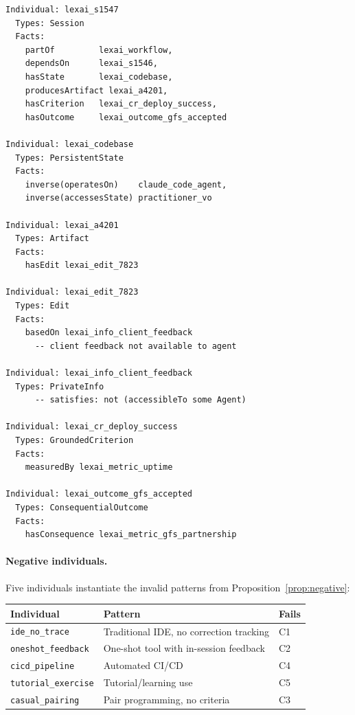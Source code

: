 \documentclass[11pt]{article}
\begin{document}
\begin{small}
\begin{verbatim}
Individual: lexai_s1547
  Types: Session
  Facts:
    partOf         lexai_workflow,
    dependsOn      lexai_s1546,
    hasState       lexai_codebase,
    producesArtifact lexai_a4201,
    hasCriterion   lexai_cr_deploy_success,
    hasOutcome     lexai_outcome_gfs_accepted

Individual: lexai_codebase
  Types: PersistentState
  Facts:
    inverse(operatesOn)    claude_code_agent,
    inverse(accessesState) practitioner_vo

Individual: lexai_a4201
  Types: Artifact
  Facts:
    hasEdit lexai_edit_7823

Individual: lexai_edit_7823
  Types: Edit
  Facts:
    basedOn lexai_info_client_feedback
      -- client feedback not available to agent

Individual: lexai_info_client_feedback
  Types: PrivateInfo
      -- satisfies: not (accessibleTo some Agent)

Individual: lexai_cr_deploy_success
  Types: GroundedCriterion
  Facts:
    measuredBy lexai_metric_uptime

Individual: lexai_outcome_gfs_accepted
  Types: ConsequentialOutcome
  Facts:
    hasConsequence lexai_metric_gfs_partnership
\end{verbatim}
\end{small}

\paragraph{Negative individuals.}
Five individuals instantiate the invalid patterns from Proposition~\ref{prop:negative}:

\begin{center}
\begin{tabular}{@{}lll@{}}
\toprule
\textbf{Individual} & \textbf{Pattern} & \textbf{Fails} \\
\midrule
\texttt{ide\_no\_trace}     & Traditional IDE, no correction tracking & C1 \\
\texttt{oneshot\_feedback}  & One-shot tool with in-session feedback  & C2 \\
\texttt{cicd\_pipeline}     & Automated CI/CD               & C4 \\
\texttt{tutorial\_exercise} & Tutorial/learning use         & C5 \\
\texttt{casual\_pairing}    & Pair programming, no criteria & C3 \\
\bottomrule
\end{tabular}
\end{center}
\end{document}
